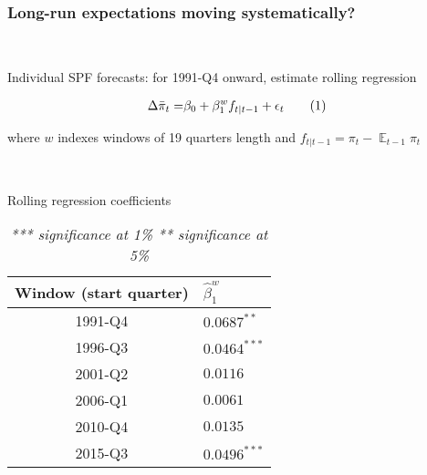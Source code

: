 \documentclass[10pt]{beamer}
\newcommand\numberthis{\addtocounter{equation}{1}\tag{\theequation}} %
\DeclareMathOperator{\E}{\mathbb{E}}
\begin{document}
\begin{frame}
\frametitle{Long-run expectations moving systematically?}\label{rolling}

\

Individual SPF forecasts: for 1991-Q4 onward, estimate rolling regression

\begin{align*}
\Delta\bar{\pi}_t = & \beta_0 + \beta^w_1 f_{t|t-1} + \epsilon_t \numberthis \\
\end{align*}

where $w$ indexes windows of 19 quarters length and $f_{t|t-1} = \pi_t - \E_{t-1}\pi_t$


\
\pause
\

\small{
\begin{center}
\begin{table}
\caption{Rolling regression coefficients}
\begin{tabular}{ c | l  }
\hline
Window (start quarter) & $\hat{\beta}_1^w$   \\ \hline
   1991-Q4 & $0.0687^{**} $ \\ \hline
   1996-Q3 & $0.0464^{***} $ \\ \hline
    2001-Q2 & $0.0116$     \\ \hline
    2006-Q1 & $0.0061$       \\ \hline  
    2010-Q4 &  $0.0135 $   \\ \hline   
    2015-Q3 &  $0.0496^{***}$ \\ \hline   
\end{tabular}     
\caption*{\footnotesize{\emph{*** significance at 1\% ** significance at 5\%}}}
       \label{table_rolling}
 \end{table}
\end{center}
}

\vspace{-0.9cm}

\hfill \hyperlink{further_evidence}{}
\end{frame}
\end{document}
